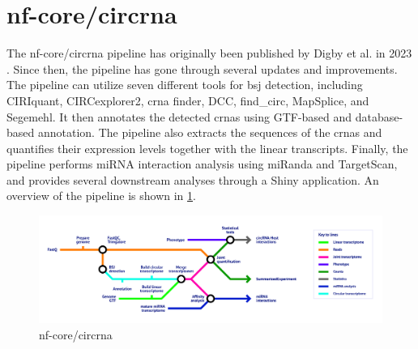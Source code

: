 \section{nf-core/circrna}
\label{sec:nf-core_circrna}
The nf-core/circrna pipeline has originally been published by Digby et al.
in
2023 \supercite{digby_nf-corecircrna_2023}.
Since then, the pipeline has gone through several updates and improvements.
The pipeline can utilize seven different tools for \gls{bsj} detection,
including CIRIquant, CIRCexplorer2, \gls{crna} finder, DCC, find\_circ,
MapSplice, and Segemehl.
It then annotates the detected \gls{crna}s using GTF-based and database-based
annotation.
The pipeline also extracts the sequences of the \gls{crna}s and quantifies
their expression levels together with the linear transcripts.
Finally, the pipeline performs miRNA interaction analysis using miRanda and
TargetScan, and provides several downstream analyses through a Shiny
application.
An overview of the pipeline is shown in \cref{fig:circrna_pipeline}.

\begin{figure}[ht]
    \centering

    \includegraphics[width=\textwidth]{chapters/3_materials_and_methods/figures/nf-core_circrna.png}
    \caption{nf-core/circrna} %
    \label{fig:circrna_pipeline}
\end{figure}






